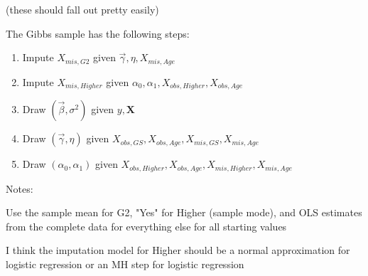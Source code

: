 \documentclass[11pt]{article}
\begin{document}
(these should fall out pretty easily)

The Gibbs sample has the following steps:

\begin{enumerate}
  \item Impute $X_{mis, G2}$ given $\vec\gamma, \eta, X_{mis, Age}$
  \item Impute $X_{mis, Higher}$ given $\alpha_0, \alpha_1, X_{obs, Higher}, X_{obs, Age}$
  \item Draw $(\vec\beta, \sigma^2)$ given $y, \mathbf{X}$
  \item Draw $(\vec{\gamma}, \eta)$ given $X_{obs, GS}, X_{obs, Age}, X_{mis, GS}, X_{mis, Age}$
  \item Draw $(\alpha_0, \alpha_1)$ given $X_{obs, Higher}, X_{obs, Age}, X_{mis, Higher}, X_{mis, Age}$  
\end{enumerate}

Notes:

Use the sample mean for G2, "Yes" for Higher (sample mode), and OLS estimates from the complete data for everything else for all starting values

I think the imputation model for Higher should be a normal approximation for logistic regression or an MH step for logistic regression

\newpage



\end{document}
